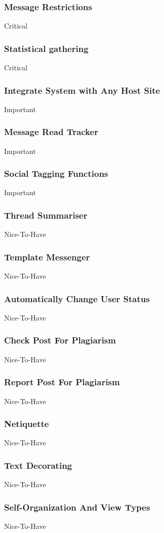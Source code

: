 \documentclass[hidelinks, 12pt, oneside]{article}
\begin{document}
\subsubsection{Message Restrictions}
Critical
\subsubsection{Statistical gathering}
Critical
\subsubsection{Integrate System with Any Host Site}
Important
\subsubsection{Message Read Tracker}
Important
\subsubsection{Social Tagging Functions}
Important
\subsubsection{Thread Summariser}
Nice-To-Have
\subsubsection{Template Messenger}
Nice-To-Have
\subsubsection{Automatically Change User Status}
Nice-To-Have
\subsubsection{Check Post For Plagiarism}
Nice-To-Have
\subsubsection{Report Post For Plagiarism}
Nice-To-Have
\subsubsection{Netiquette}
Nice-To-Have
\subsubsection{Text Decorating}
Nice-To-Have
\subsubsection{Self-Organization And View Types}
Nice-To-Have
\end{document}
